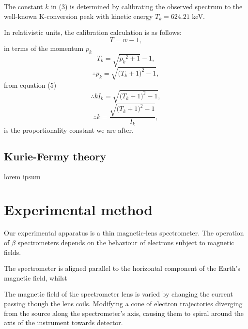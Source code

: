 \documentclass[10pt, a4paper]{article}
\begin{document}
\begin{multicols}{2}
The constant $k$ in (3) is determined by calibrating the observed spectrum to the well-known K-conversion peak with kinetic energy $T_k = 624.21$ keV.
 
In relativistic units, the calibration calculation is as follows:
\begin{equation}T = w - 1,
\end{equation}
in terms of the momentum $p_k$
\begin{equation}T_k = \sqrt{{p_{k}}^{2} + 1} -1,
\end{equation}
\begin{equation} \therefore p_k = \sqrt{({T_{k} + 1)}^{2} - 1 },
\end{equation}
from equation (5)
\begin{equation} \therefore k I_k = \sqrt{({T_{k} + 1)}^{2} - 1 },
\end{equation}
\begin{equation} \therefore k = \frac{\sqrt{({T_{k} + 1)}^{2} - 1 }}{I_k},
\end{equation}
is the proportionality constant we are after.

\subsection{Kurie-Fermy theory}

lorem ipsum

\section{Experimental method}
Our experimental apparatus is a thin magnetic-lens spectrometer. 
The operation of $\beta$ spectrometers depends on the behaviour of electrons subject to magnetic fields. 

The spectrometer is aligned parallel to the horizontal component of the Earth's magnetic field, whilst 

The magnetic field of the spectrometer lens is varied by changing the current passing though the lens coils.
Modifying a cone of electron trajectories diverging from the source along the spectrometer's axis, causing them to spiral around the axis of the instrument towards detector\cite{SPA}. 


\end{multicols}
\end{document}
